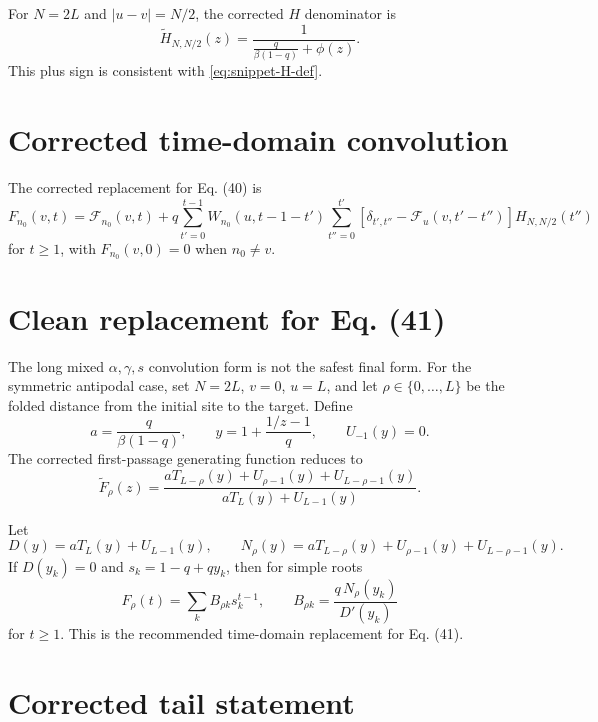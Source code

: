 \documentclass[11pt]{article}
\newcommand{\wt}{\widetilde}
\newcommand{\Fcal}{\mathcal{F}}
\begin{document}
For \(N=2L\) and \(|u-v|=N/2\), the corrected \(H\) denominator is
\begin{equation}
  \wt H_{N,N/2}(z)
  =
  \frac{1}{\frac{q}{\beta(1-q)}+\phi(z)}.
  \label{eq:snippet-H-symmetric}
\end{equation}
This plus sign is consistent with \eqref{eq:snippet-H-def}.

\section*{Corrected time-domain convolution}

The corrected replacement for Eq. (40) is
\begin{equation}
  \boxed{
  F_{n_0}(v,t)=\Fcal_{n_0}(v,t)
  +q\sum_{t'=0}^{t-1}W_{n_0}(u,t-1-t')
  \sum_{t''=0}^{t'}
  \left[\delta_{t',t''}-\Fcal_u(v,t'-t'')\right]
  H_{N,N/2}(t'')}
  \label{eq:snippet-time-convolution}
\end{equation}
for \(t\geq1\), with \(F_{n_0}(v,0)=0\) when \(n_0\neq v\).

\section*{Clean replacement for Eq. (41)}

The long mixed \(\alpha,\gamma,s\) convolution form is not the safest final
form.  For the symmetric antipodal case, set \(N=2L\), \(v=0\), \(u=L\), and
let \(\rho\in\{0,\ldots,L\}\) be the folded distance from the initial site to
the target.  Define
\[
  a=\frac{q}{\beta(1-q)},\qquad
  y=1+\frac{1/z-1}{q},\qquad U_{-1}(y)=0.
\]
The corrected first-passage generating function reduces to
\begin{equation}
  \boxed{
  \wt F_\rho(z)
  =
  \frac{
    aT_{L-\rho}(y)+U_{\rho-1}(y)+U_{L-\rho-1}(y)
  }{
    aT_L(y)+U_{L-1}(y)
  }}.
  \label{eq:snippet-closed-form}
\end{equation}

Let
\[
  D(y)=aT_L(y)+U_{L-1}(y),\qquad
  N_\rho(y)=aT_{L-\rho}(y)+U_{\rho-1}(y)+U_{L-\rho-1}(y).
\]
If \(D(y_k)=0\) and \(s_k=1-q+qy_k\), then for simple roots
\begin{equation}
  \boxed{
  F_\rho(t)=\sum_k B_{\rho k}s_k^{t-1},
  \qquad
  B_{\rho k}=\frac{q\,N_\rho(y_k)}{D'(y_k)}
  }
  \label{eq:snippet-partial-fraction}
\end{equation}
for \(t\geq1\).  This is the recommended time-domain replacement for Eq. (41).

\section*{Corrected tail statement}
\end{document}
